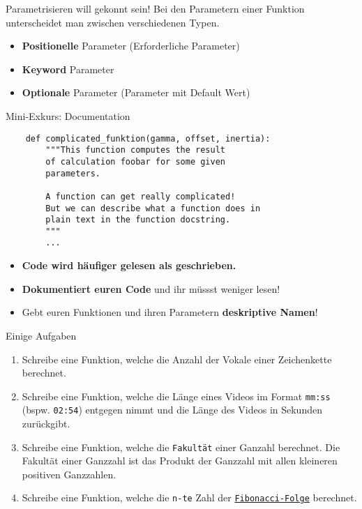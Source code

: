\begin{frame}[fragile]{Parametrisieren will gekonnt sein!}
Bei den Parametern einer Funktion unterscheidet man zwischen verschiedenen Typen.
\begin{itemize}
    \item \textbf{Positionelle} Parameter (Erforderliche Parameter)
    \item \textbf{Keyword} Parameter
    \item \textbf{Optionale} Parameter (Parameter mit Default Wert)
\end{itemize}
\end{frame}

\begin{frame}[fragile]{Mini-Exkurs: Documentation}
    \begin{lstlisting}
    def complicated_funktion(gamma, offset, inertia):
        """This function computes the result
        of calculation foobar for some given
        parameters.

        A function can get really complicated!
        But we can describe what a function does in
        plain text in the function docstring.
        """
        ...
    \end{lstlisting}
    \begin{itemize}
        \item \textbf{\alert{Code wird häufiger gelesen als geschrieben.}}
        \item \textbf{Dokumentiert euren Code} und ihr müssst weniger lesen!
        \item Gebt euren Funktionen und ihren Parametern \textbf{deskriptive Namen}!
    \end{itemize}
\end{frame}

\begin{frame}{Einige Aufgaben}
    \begin{enumerate}
        \item Schreibe eine Funktion, welche die Anzahl der Vokale einer Zeichenkette berechnet.
        \item Schreibe eine Funktion, welche die Länge eines Videos im Format \texttt{mm:ss} (bspw. \texttt{02:54}) entgegen nimmt und die Länge des Videos in Sekunden zurückgibt.
        \item Schreibe eine Funktion, welche die \texttt{Fakultät} einer Ganzahl berechnet. Die Fakultät einer Ganzzahl ist das Produkt der Ganzzahl mit allen kleineren positiven Ganzzahlen.
        \item Schreibe eine Funktion, welche die \texttt{n-te} Zahl der \href{https://de.wikipedia.org/wiki/Fibonacci-Folge}{\texttt{Fibonacci-Folge}} berechnet.
    \end{enumerate}
\end{frame}

